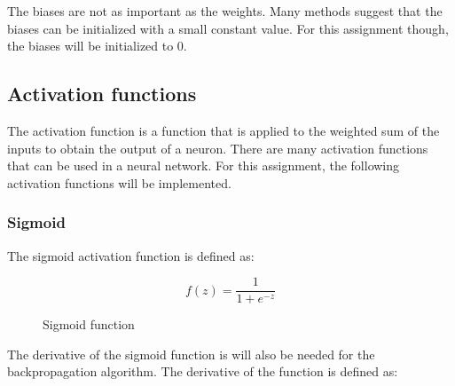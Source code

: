 The biases are not as important as the weights. Many methods suggest that the biases can be initialized with
a small constant value. For this assignment though, the biases will be initialized to 0.

\subsection{Activation functions}

The activation function is a function that is applied to the weighted sum of the inputs to obtain the output of
a neuron. There are many activation functions that can be used in a neural network. For this assignment, the
following activation functions will be implemented.

\subsubsection{Sigmoid}

\noindent
The sigmoid activation function is defined as:

\begin{equation}
    \label{eq:sigmoid}
    f(z) = \frac{1}{1 + e^{-z}}
\end{equation}

\begin{center}
    \begin{figure}[ht]
        \caption{Sigmoid function}
    \end{figure}
\end{center}

The derivative of the sigmoid function is will also be needed for the backpropagation algorithm. The derivative
of the function is defined as:


